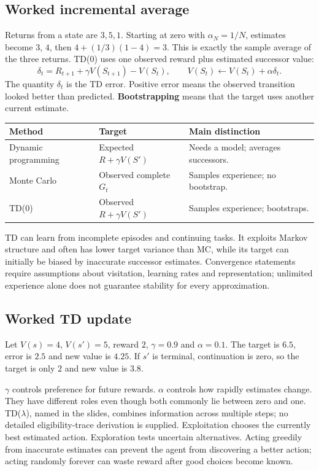 \documentclass[11pt]{article}
\begin{document}
\subsection{Worked incremental average}
Returns from a state are $3,5,1$. Starting at zero with $\alpha_N=1/N$, estimates become $3$, $4$, then $4+(1/3)(1-4)=3$. This is exactly the sample average of the three returns.
TD(0) uses one observed reward plus estimated successor value:
\[
\delta_t=R_{t+1}+\gamma V(S_{t+1})-V(S_t),\qquad
V(S_t)\leftarrow V(S_t)+\alpha\delta_t.
\]
The quantity $\delta_t$ is the TD error. Positive error means the observed transition looked better than predicted. \textbf{Bootstrapping} means that the target uses another current estimate.
\begin{longtable}{@{}P{.18\textwidth}P{.39\textwidth}P{.34\textwidth}@{}}
\toprule Method & Target & Main distinction\\\midrule\endhead
Dynamic programming & Expected $R+\gamma V(S')$ & Needs a model; averages successors.\\
Monte Carlo & Observed complete $G_t$ & Samples experience; no bootstrap.\\
TD(0) & Observed $R+\gamma V(S')$ & Samples experience; bootstraps.\\\bottomrule
\end{longtable}
TD can learn from incomplete episodes and continuing tasks. It exploits Markov structure and often has lower target variance than MC, while its target can initially be biased by inaccurate successor estimates. Convergence statements require assumptions about visitation, learning rates and representation; unlimited experience alone does not guarantee stability for every approximation.
\subsection{Worked TD update}
Let $V(s)=4$, $V(s')=5$, reward $2$, $\gamma=0.9$ and $\alpha=0.1$. The target is $6.5$, error is $2.5$ and new value is $4.25$. If $s'$ is terminal, continuation is zero, so the target is only $2$ and new value is $3.8$.

$\gamma$ controls preference for future rewards. $\alpha$ controls how rapidly estimates change. They have different roles even though both commonly lie between zero and one. TD($\lambda$), named in the slides, combines information across multiple steps; no detailed eligibility-trace derivation is supplied.
Exploitation chooses the currently best estimated action. Exploration tests uncertain alternatives. Acting greedily from inaccurate estimates can prevent the agent from discovering a better action; acting randomly forever can waste reward after good choices become known.
\end{document}
